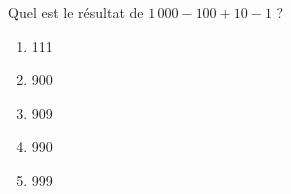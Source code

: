 Quel est le résultat de $1\,000-100+10-1$ ?
\begin{multicols}{5}
  \begin{enumerate}[A/]
  \item 111
  \item 900
  \item 909
  \item 990
  \item 999
  \end{enumerate}
\end{multicols}
